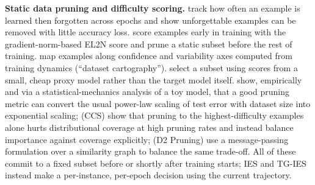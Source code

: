 \documentclass{article}
\theoremstyle{plain}
\theoremstyle{definition}
\theoremstyle{remark}
\begin{document}
\textbf{Static data pruning and difficulty scoring.} \citet{toneva2019empirical} track how often an example is learned then forgotten across epochs and show unforgettable examples can be removed with little accuracy loss. \citet{paul2021deep} score examples early in training with the gradient-norm-based EL2N score and prune a static subset before the rest of training. \citet{swayamdipta2020dataset} map examples along confidence and variability axes computed from training dynamics (``dataset cartography''). \citet{coleman2020selection} select a subset using scores from a small, cheap proxy model rather than the target model itself. \citet{sorscher2022beyond} show, empirically and via a statistical-mechanics analysis of a toy model, that a good pruning metric can convert the usual power-law scaling of test error with dataset size into exponential scaling; \citet{zheng2023coverage} (CCS) show that pruning to the highest-difficulty examples alone hurts distributional coverage at high pruning rates and instead balance importance against coverage explicitly; \citet{maharana2024d2} (D2 Pruning) use a message-passing formulation over a similarity graph to balance the same trade-off. All of these commit to a fixed subset before or shortly after training starts; IES and TG-IES instead make a per-instance, per-epoch decision using the current trajectory.
\end{document}
